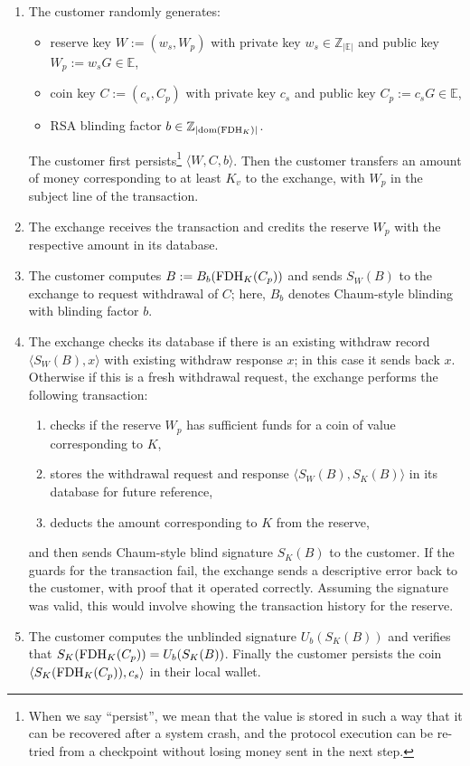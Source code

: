 \documentclass[sigconf, authordraft]{acmart}
\newcommand\inecc{\in \mathbb{Z}_{|\mathbb{E}|}}
\newcommand\inept{\in {\mathbb{E}}}
\newcommand\inrsa{\in \mathbb{Z}_{|\mathrm{dom}(\FDH_K)|}}
\begin{document}
\begin{enumerate}
  \item The customer randomly generates:
    \begin{itemize}
      \item reserve key $W := (w_s,W_p)$ with private key $w_s \inecc$ and public key $W_p := w_sG \inept$,
      \item coin key $C := (c_s,C_p)$ with private key $c_s$ and public key $C_p := c_s G \inept$,
      \item RSA blinding factor $b \inrsa$.
    \end{itemize}
    The customer first persists\footnote{When we say ``persist'', we mean that the value
    is stored in such a way that it can be recovered after a system crash, and
    the protocol execution can be re-tried from a checkpoint
    without losing money sent in the next step.} $\langle W, C, b \rangle$.
    Then the customer transfers an amount of money corresponding to
    at least $K_v$ to the exchange, with $W_p$ in the subject line
    of the transaction.
  \item
    The exchange receives the transaction and credits the reserve $W_p$
    with the respective amount in its database.
  \item
    The customer computes $B := B_b(\textrm{FDH}_K(C_p))$ and sends $S_W(B)$ to
    the exchange to request withdrawal of $C$; here, $B_b$ denotes
    Chaum-style blinding with blinding factor $b$.
  \item
    The exchange checks its database if there is an existing withdraw record $\langle S_W(B), x \rangle$
    with existing withdraw response $x$; in this case it sends back $x$.\\
    Otherwise if this is a fresh withdrawal request, the exchange performs the following transaction:
    \begin{enumerate}
      \item checks if the reserve $W_p$ has sufficient funds
            for a coin of value corresponding to $K$,
      \item stores the withdrawal request and response
            $\langle S_W(B), S_K(B) \rangle$ in its database
            for future reference,
      \item deducts the amount corresponding to $K$ from the reserve,
    \end{enumerate}
    and then sends Chaum-style blind signature $S_K(B)$ to the customer.
    If the guards for the transaction fail, the exchange sends a descriptive
    error back to the customer, with proof that it operated correctly.
    Assuming the signature was valid, this would involve showing the transaction
    history for the reserve.
  \item The customer computes the unblinded signature $U_b(S_K(B))$ and
    verifies that $S_K(\textrm{FDH}_K(C_p)) = U_b(S_K(B))$.
    Finally the customer persists the coin $\langle S_K(\textrm{FDH}_K(C_p)), c_s \rangle$
    in their local wallet.
\end{enumerate}
\end{document}

